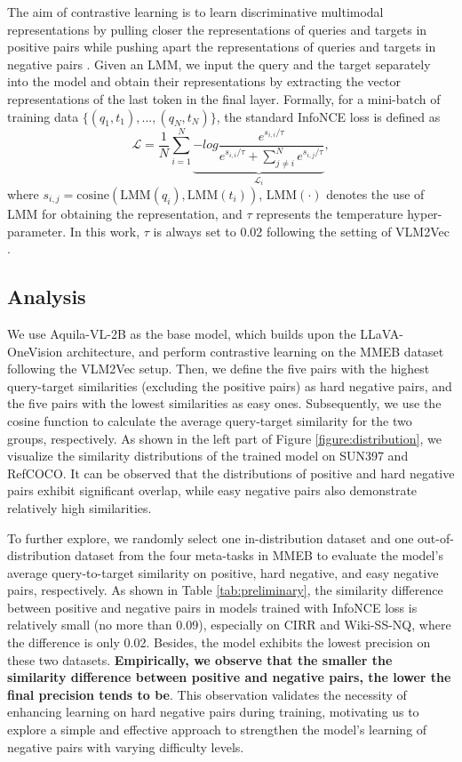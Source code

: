 \documentclass[11pt]{article}
\begin{document}
The aim of contrastive learning is to learn discriminative multimodal representations by pulling closer the representations of queries and targets in positive pairs while pushing apart the representations of queries and targets in negative pairs \cite{DBLP:conf/cvpr/HadsellCL06}. Given an LMM, we input the query and the target separately into the model and obtain their representations by extracting the vector representations of the last token in the final layer. Formally, for a mini-batch of training data $\{(q_1, t_1),..., (q_N, t_N)\}$, the standard InfoNCE loss is defined as
\begin{equation}
    \mathcal{L} = \frac{1}{N} \sum_{i=1}^{N} \underbrace{-log\frac{e^{{s_{i,i}/\tau}}}{e^{{s_{i,i}/\tau}}+\sum_{j\neq i}^{N}e^{{s_{i,j}/\tau}}}}_{\mathcal{L}_i},
\end{equation}
where $s_{i,j}=\mathrm{cosine}(\mathrm{LMM}(q_i), \mathrm{LMM}(t_i))$, $\mathrm{LMM}(\cdot)$ denotes the use of LMM for obtaining the representation, and $\tau$ represents the temperature hyper-parameter. In this work, $\tau$ is always set to 0.02 following the setting of VLM2Vec \cite{VLM2Vec}.


\subsection{Analysis}
We use Aquila-VL-2B \cite{DBLP:journals/corr/abs-2410-18558} as the base model, which builds upon the LLaVA-OneVision architecture, and perform contrastive learning on the MMEB dataset following the VLM2Vec setup. Then, we define the five pairs with the highest query-target similarities (excluding the positive pairs) as hard negative pairs, and the five pairs with the lowest similarities as easy ones. Subsequently, we use the cosine function to calculate the average query-target similarity for the two groups, respectively. As shown in the left part of Figure \ref{figure:distribution}, we visualize the similarity distributions of the trained model on SUN397 and RefCOCO. It can be observed that the distributions of positive and hard negative pairs exhibit significant overlap, while easy negative pairs also demonstrate relatively high similarities. 

To further explore, we randomly select one in-distribution dataset and one out-of-distribution dataset from the four meta-tasks in MMEB to evaluate the model's average query-to-target similarity on positive, hard negative, and easy negative pairs, respectively. As shown in Table \ref{tab:preliminary}, the similarity difference between positive and negative pairs in models trained with InfoNCE loss is relatively small (no more than 0.09), especially on CIRR and Wiki-SS-NQ, where the difference is only 0.02. Besides, the model exhibits the lowest precision on these two datasets. \textbf{Empirically, we observe that the smaller the similarity difference between positive and negative pairs, the lower the final precision tends to be}. This observation validates the necessity of enhancing learning on hard negative pairs during training, motivating us to explore a simple and effective approach to strengthen the model's learning of negative pairs with varying difficulty levels.
\end{document}
